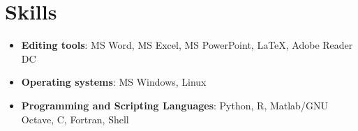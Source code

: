 \documentclass[letterpaper,11pt]{article}
\newcommand{\resumeItem}[2]{
	\item\small{
		\textbf{#1}{: #2 \vspace{-2pt}}
	}
}
\newcommand{\resumeSubItem}[2]{\resumeItem{#1}{#2}\vspace{-4pt}}
\newcommand{\resumeSubHeadingListStart}{\begin{itemize}[leftmargin=*]}
\newcommand{\resumeSubHeadingListEnd}{\end{itemize}}
\begin{document}
	
	\section{Skills}
	\resumeSubHeadingListStart
	\resumeSubItem{Editing tools}
	{MS Word, MS Excel, MS PowerPoint, LaTeX, Adobe Reader DC}
	\resumeSubItem{Operating systems}
	{MS Windows, Linux}
	\resumeSubItem{Programming and Scripting Languages}
	{Python, R, Matlab/GNU Octave, C, Fortran, Shell}
	\resumeSubHeadingListEnd
	
\end{document}
